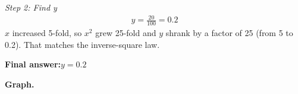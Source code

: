 \documentclass[11pt]{article}
\begin{document}
\textit{Step 2: Find y}
\[\begin{gathered}
y = \frac{20}{100} = 0.2
\end{gathered}\]
\( x \) increased 5-fold, so \( x^2 \) grew 25-fold and \( y \) shrank by a factor of 25 (from 5 to 0.2). That matches the inverse-square law.

\begin{answerbox}
\textbf{Final answer:}\quad \(\displaystyle y = 0.2\)
\end{answerbox}
\textbf{Graph.}

\begin{center}
\end{center}
\end{document}
